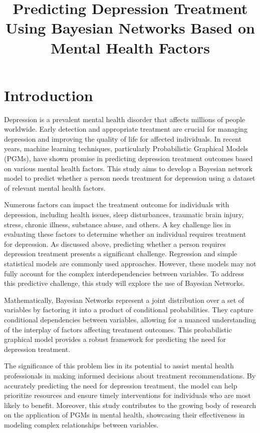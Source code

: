 \documentclass[conference]{IEEEtran}
\begin{document}
\title{Predicting Depression Treatment Using Bayesian Networks Based on Mental Health Factors}

\author{
}
\maketitle
\section{Introduction}
Depression is a prevalent mental health disorder that affects millions of people worldwide. Early detection and appropriate treatment are crucial for managing depression and improving the quality of life for affected individuals. In recent years, machine learning techniques, particularly Probabilistic Graphical Models (PGMs), have shown promise in predicting depression treatment outcomes based on various mental health factors. This study aims to develop a Bayesian network model to predict whether a person needs treatment for depression using a dataset of relevant mental health factors.

Numerous factors can impact the treatment outcome for individuals with depression, including health issues, sleep disturbances, traumatic brain injury, stress, chronic illness, substance abuse, and others. A key challenge lies in evaluating these factors to determine whether an individual requires treatment for depression.  As discussed above, predicting whether a person requires depression treatment presents a significant challenge. Regression and simple statistical models are commonly used approaches. However, these models may not fully account for the complex interdependencies between variables. To address this predictive challenge, this study will explore the use of Bayesian Networks.

Mathematically, Bayesian Networks represent a joint distribution over a set of variables by factoring it into a product of conditional probabilities. They capture conditional dependencies between variables, allowing for a nuanced understanding of the interplay of factors affecting treatment outcomes. This probabilistic graphical model provides a robust framework for predicting the need for depression treatment.

The significance of this problem lies in its potential to assist mental health professionals in making informed decisions about treatment recommendations. By accurately predicting the need for depression treatment, the model can help prioritize resources and ensure timely interventions for individuals who are most likely to benefit. Moreover, this study contributes to the growing body of research on the application of PGMs in mental health, showcasing their effectiveness in modeling complex relationships between variables.
\end{document}

